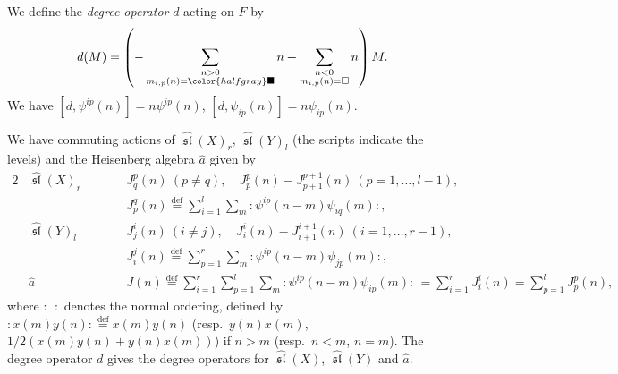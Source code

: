 \documentclass[pdftex]{sigma}
\theoremstyle{definition}
\numberwithin{equation}{section}
\newcommand{\defeq}{\overset{\operatorname{\scriptstyle def}}{=}}
\newcommand{\algsl}{\operatorname{\mathfrak{sl}}} %
\newcommand{\graysquare}{\color{halfgray}\blacksquare}
\begin{document}
We def\/ine the {\it degree operator} $d$ acting on $F$ by{\samepage
\begin{equation*}
   d(M) = \left(
     - \sum_{\substack{n > 0\\ m_{i,p}(n) = \graysquare}} n
     + \sum_{\substack{n < 0\\ m_{i,p}(n) = \square}} n
   \right) M.
\end{equation*}
We have $[d, \psi^{ip}(n)] = n \psi^{ip}(n)$, $[d, \psi_{ip}(n)] = n
\psi_{ip}(n)$.}

We have commuting actions of $\widehat{\algsl}(X)_r$,
$\widehat{\algsl}(Y)_l$ (the scripts indicate the levels) and the
Heisenberg algebra $\widehat{a}$ given by {\allowdisplaybreaks
\begin{alignat*}{2}
   & \widehat{\algsl}(X)_r & \qquad
   & J^p_q(n) \ (p\neq q), \quad
     J^p_p(n) - J_{p+1}^{p+1}(n) \ (p=1,\dots, l-1),
\\
   &&&
   J_p^q(n) \defeq \sum_{i=1}^l \sum_m :\!
   \psi^{ip}(n-m)\psi_{iq}(m)\!:,
\\
   & \widehat{\algsl}(Y)_l & \qquad
   & J^i_j(n) \ (i\neq j), \quad
     J^i_i(n) - J_{i+1}^{i+1}(n) \ (i=1,\dots, r-1),
\\
   &&&
   J_i^j(n) \defeq \sum_{p=1}^r \sum_m :\! \psi^{ip}(n-m)\psi_{jp}(m)\!:,
\\
  & \widehat{a} & \qquad
  &
     J(n) \defeq \sum_{i=1}^r \sum_{p=1}^l \sum_m
     :\! \psi^{ip}(n-m)\psi_{ip}(m)\!:\,
     = \sum_{i=1}^r J_i^i(n)
     = \sum_{p=1}^l J_p^p(n),
\end{alignat*}
where} $:\!\ \ \!:$ denotes the normal ordering, def\/ined by
\(
   :\! x(m) y(n) \!: \defeq x(m) y(n)
\)
(resp.\ $y(n) x(m)$, $1/2(x(m)y(n)+y(n)x(m))$) if
$n > m$ (resp.\ $n < m$, $n=m$).
%
The degree operator $d$ gives the degree operators for
$\widehat{\algsl}(X)$, $\widehat{\algsl}(Y)$ and $\widehat{a}$.
\end{document}
